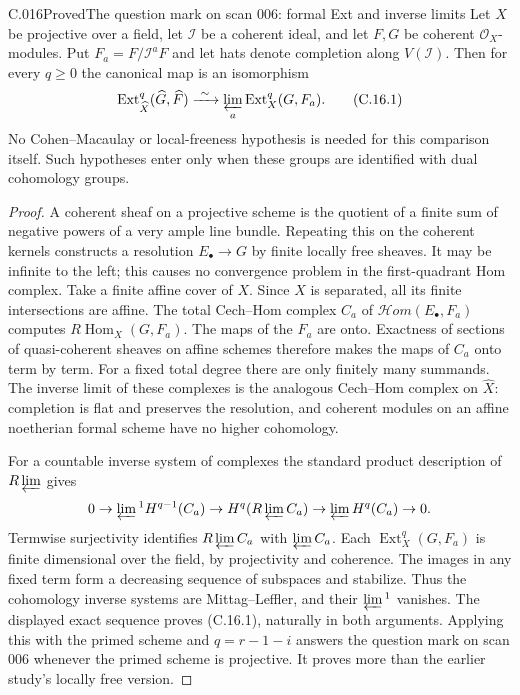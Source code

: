\begin{saresult}{C.016}{Proved}{The question mark on scan 006: formal Ext and inverse limits}
Let $X$ be projective over a field, let $\mathcal I$ be a coherent ideal,
and let $F,G$ be coherent $\mathcal O_X$-modules. Put
$F_a=F/\mathcal I^aF$ and let hats denote completion along
$V(\mathcal I)$. Then for every $q\geq0$ the canonical map is an
isomorphism
\[
 \operatorname{Ext}^q_{\widehat X}(\widehat G,\widehat F)
 \xrightarrow{\ \sim\ }
 \varprojlim_a\operatorname{Ext}^q_X(G,F_a).
 \tag{C.16.1}
\]
No Cohen--Macaulay or local-freeness hypothesis is needed for this
comparison itself. Such hypotheses enter only when these groups are
identified with dual cohomology groups.
\end{saresult}
\begin{proof}
A coherent sheaf on a projective scheme is the quotient of a finite
sum of negative powers of a very ample line bundle. Repeating this on
the coherent kernels constructs a resolution $E_\bullet\to G$ by
finite locally free sheaves. It may be infinite to the left; this
causes no convergence problem in the first-quadrant Hom complex.
Take a finite affine cover of $X$. Since $X$ is separated, all its
finite intersections are affine. The total Cech--Hom complex $C_a$
of $\mathcal Hom(E_\bullet,F_a)$ computes
$R\operatorname{Hom}_X(G,F_a)$.
The maps of the $F_a$ are onto. Exactness of sections of quasi-coherent
sheaves on affine schemes therefore makes the maps of $C_a$ onto
term by term. For a fixed total degree there are only finitely many
summands. The inverse limit of these complexes is the analogous
Cech--Hom complex on $\widehat X$: completion is flat and preserves
the resolution, and coherent modules on an affine noetherian formal
scheme have no higher cohomology.

For a countable inverse system of complexes the standard product
description of $R\varprojlim$ gives
\[
 0\to\varprojlim{}^1 H^{q-1}(C_a)\to
 H^q(R\varprojlim C_a)\to\varprojlim H^q(C_a)\to0.
\]
Termwise surjectivity identifies $R\varprojlim C_a$ with
$\varprojlim C_a$. Each $\operatorname{Ext}^q_X(G,F_a)$ is finite
dimensional over the field, by projectivity and coherence. The images
in any fixed term form a decreasing sequence of subspaces and
stabilize. Thus the cohomology inverse systems are Mittag--Leffler,
and their $\varprojlim{}^1$ vanishes. The displayed exact sequence
proves (C.16.1), naturally in both arguments. Applying this with the
primed scheme and $q=r-1-i$ answers the question mark on scan 006
whenever the primed scheme is projective. It proves more than the
earlier study's locally free version.
\end{proof}

